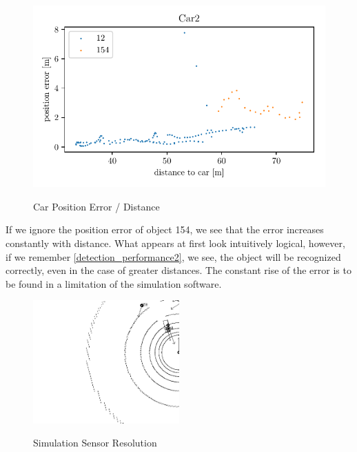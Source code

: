 \documentclass[11pt,oneside,openright]{mpreport}
\begin{document}
\begin{figure}[!htb]
  \caption{Car Position Error / Distance} 
  \centering
  \includegraphics[width=\textwidth]{bilder/Car2_pos_err_dist.pdf}
 \label{car_pos_err_dist}
\end{figure}


If we ignore the position error of object 154, we see that the error increases constantly with distance. 
What appears at first look intuitively logical, however, if we remember \cref{detection_performance2}, we see, the object will be recognized correctly, even in the case of greater distances.
The constant rise of the error is to be found in a limitation of the simulation software.

\begin{figure}[!htb]
  \caption{Simulation Sensor Resolution} 
  \centering
  \includegraphics[width=0.5\textwidth]{bilder/sen_err.png}
 \label{sen_res}
\end{figure}
\end{document}
